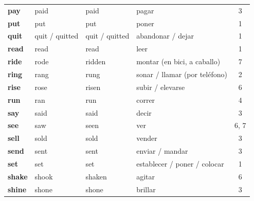 \documentclass[11pt,a4paper]{article}
\begin{document}
\begin{longtable}{>{\bfseries}p{2.6cm}p{3.4cm}p{3.6cm}>{\raggedright\arraybackslash}p{6.0cm}c}
\textcolor{verdeO}{pay} & \textcolor{verdeO}{paid} & \textcolor{verdeO}{paid} & \textcolor{verdeO}{pagar} & \textcolor{verdeO}{3}\\
\textcolor{amarilloO}{put} & \textcolor{amarilloO}{put} & \textcolor{amarilloO}{put} & \textcolor{amarilloO}{poner} & \textcolor{amarilloO}{1}\\
\textcolor{amarilloO}{quit} & \textcolor{amarilloO}{quit / quitted} & \textcolor{amarilloO}{quit / quitted} & \textcolor{amarilloO}{abandonar / dejar} & \textcolor{amarilloO}{1}\\
\textcolor{amarilloO}{read} & \textcolor{amarilloO}{read} & \textcolor{amarilloO}{read} & \textcolor{amarilloO}{leer} & \textcolor{amarilloO}{1}\\
\textcolor{azulO}{ride} & \textcolor{azulO}{rode} & \textcolor{azulO}{ridden} & \textcolor{azulO}{montar (en bici, a caballo)} & \textcolor{azulO}{7}\\
\textcolor{naranjaO}{ring} & \textcolor{naranjaO}{rang} & \textcolor{naranjaO}{rung} & \textcolor{naranjaO}{sonar / llamar (por teléfono)} & \textcolor{naranjaO}{2}\\
\textcolor{rosaO}{rise} & \textcolor{rosaO}{rose} & \textcolor{rosaO}{risen} & \textcolor{rosaO}{subir / elevarse} & \textcolor{rosaO}{6}\\
\textcolor{moradoO}{run} & \textcolor{moradoO}{ran} & \textcolor{moradoO}{run} & \textcolor{moradoO}{correr} & \textcolor{moradoO}{4}\\
\textcolor{verdeO}{say} & \textcolor{verdeO}{said} & \textcolor{verdeO}{said} & \textcolor{verdeO}{decir} & \textcolor{verdeO}{3}\\
\textcolor{rosaO}{see} & \textcolor{rosaO}{saw} & \textcolor{rosaO}{seen} & \textcolor{rosaO}{ver} & \textcolor{rosaO}{6, 7}\\
\textcolor{verdeO}{sell} & \textcolor{verdeO}{sold} & \textcolor{verdeO}{sold} & \textcolor{verdeO}{vender} & \textcolor{verdeO}{3}\\
\textcolor{verdeO}{send} & \textcolor{verdeO}{sent} & \textcolor{verdeO}{sent} & \textcolor{verdeO}{enviar / mandar} & \textcolor{verdeO}{3}\\
\textcolor{amarilloO}{set} & \textcolor{amarilloO}{set} & \textcolor{amarilloO}{set} & \textcolor{amarilloO}{establecer / poner / colocar} & \textcolor{amarilloO}{1}\\
\textcolor{rosaO}{shake} & \textcolor{rosaO}{shook} & \textcolor{rosaO}{shaken} & \textcolor{rosaO}{agitar} & \textcolor{rosaO}{6}\\
\textcolor{verdeO}{shine} & \textcolor{verdeO}{shone} & \textcolor{verdeO}{shone} & \textcolor{verdeO}{brillar} & \textcolor{verdeO}{3}\\

\end{longtable}
\end{document}
